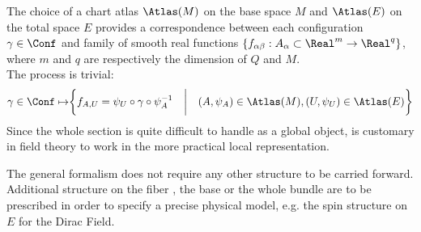 \documentclass[Main]{subfiles}
\begin{document}
	\vspace{2mm}
	The choice of a chart atlas $\Atlas(M)$ on the base space $M$ and $\Atlas(E)$ on the total space $E$ provides a correspondence between each configuration $\gamma \in \Conf$ and family of smooth real functions $\{f_{\alpha \beta}:A_\alpha \subset \Real^m \rightarrow \Real^q \}$, where $m$ and $q$ are respectively the dimension of $Q$ and $M$.	
	\\
	The process is trivial:
	\begin{equation}\label{Def:LocalChartRepresentation}
		\gamma \in \Conf \mapsto \biggr\{f_{A,U}=\psi_U \circ \gamma \circ \psi_A^{-1} \quad \biggr\vert \quad (A,\psi_A) \in \Atlas(M), (U,\psi_U)\in \Atlas(E)   \biggr\}
	\end{equation}
	Since the whole section is quite difficult to handle  as a global object, is customary in field theory to work in the more practical local representation. 
	
	\vspace{2mm}
	 	The general formalism does not require any other structure to be carried forward.
	 	Additional structure on the fiber , the base or the whole bundle are to be prescribed in order to specify a precise physical model, e.g. the spin structure on $E$ for the Dirac Field.\cite{Benini}
	
\end{document}

